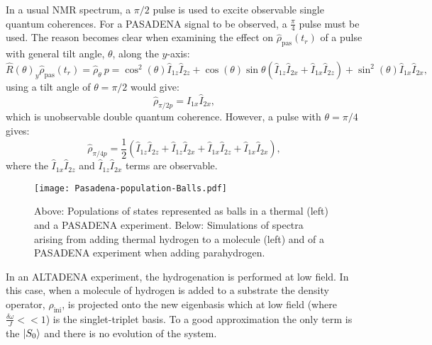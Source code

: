  In a usual NMR spectrum, a $\pi/2$ pulse is used to excite observable single quantum coherences. For a PASADENA signal to
 be observed, a $\frac{\pi}{4}$ pulse must be used. The reason becomes clear when examining the effect on $\hat{\rho}_{\text{pas}}(t_r)$ of a pulse with general
 tilt angle, $\theta$, along the $y$-axis:
\begin{equation}
  \hat{R}(\theta)_y\hat{\rho}_{\text{pas}}(t_r) = \hat{\rho}_\theta~p = \cos^2(\theta)\hat{I}_{1z}\hat{I}_{2z} +
  \cos(\theta)\sin{\theta}(\hat{I}_{1z}\hat{I}_{2x} + \hat{I}_{1x}\hat{I}_{2z}) + \sin^2(\theta)\hat{I}_{1x}\hat{I}_{2x},
\end{equation}
using a tilt angle of $\theta = \pi/2$ would give:
\begin{equation}
  \hat{\rho}_{\pi/2p}  = \hat{I}_{1x}\hat{I}_{2x},
\end{equation}
which is unobservable double quantum coherence. However, a pulse with $\theta = \pi/4$ gives:
\begin{equation}
  \hat{\rho}_{\pi/4p} = \frac{1}{2}(\hat{I}_{1z}\hat{I}_{2z} + \hat{I}_{1z}\hat{I}_{2x} + \hat{I}_{1x}\hat{I}_{2z} + \hat{I}_{1x}\hat{I}_{2x}),
\end{equation}
where the $\hat{I}_{1x}\hat{I}_{2z}$ and $\hat{I}_{1z}\hat{I}_{2x}$ terms are observable.

 \begin{figure*}[ht]
   \begin{center}
   \texttt{[image: Pasadena-population-Balls.pdf]}
   \end{center}
   \caption{Above: Populations of states represented as balls in a thermal (left) and a PASADENA experiment. Below: Simulations
   of spectra arising from adding thermal hydrogen to a molecule (left) and of a PASADENA experiment when adding parahydrogen.}
   \label{fig:PASADENA}
 \end{figure*}

 In an ALTADENA experiment, the hydrogenation is performed at low field. In this case, when a molecule of hydrogen
 is added to a substrate the density operator, $\hat{\rho}_\text{ini}$, is projected onto the new eigenbasis which
 at low field (where $\frac{\delta{\omega}}{J}<<1$) is the singlet-triplet basis. To a good approximation the only term
 is the $\ket{S_0}$ and there is no evolution of the system.


